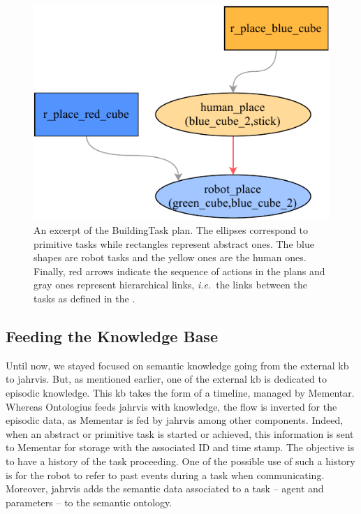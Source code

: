 \documentclass[a4paper,11pt,twoside]{StyleThese}
\begin{document}
\begin{figure}[!ht]
	\centering
	\includegraphics[width=0.5\linewidth]{figures/chapter2/excerpt_plan.pdf}
	\caption{An excerpt of the BuildingTask plan. The ellipses correspond to primitive tasks while rectangles represent abstract ones. The blue shapes are robot tasks and the yellow ones are the human ones. Finally, red arrows indicate the sequence of actions in the plans and gray ones represent hierarchical links, \textit{i.e.}~the links between the tasks as defined in the .}
	\label{chap6:fig:excerpt_plan}
\end{figure}

\subsection{Feeding the Knowledge Base}\label{chap6:subsec:feeding}
Until now, we stayed focused on semantic knowledge going from the external \acrshort{kb} to \acrshort{jahrvis}. But, as mentioned earlier, one of the external \acrshort{kb} is dedicated to episodic knowledge. This \acrshort{kb} takes the form of a timeline, managed by Mementar. Whereas Ontologius feeds \acrshort{jahrvis} with knowledge, the flow is inverted for the episodic data, as Mementar is fed by \acrshort{jahrvis} among other components. Indeed, when an abstract or primitive task is started or achieved, this information is sent to Mementar for storage with the associated ID and time stamp. The objective is to have a history of the task proceeding. One of the possible use of such a history is for the robot to refer to past events during a task when communicating.
Moreover, \acrshort{jahrvis} adds the semantic data associated to a task -- agent and parameters -- to the semantic ontology. 


\end{document}
